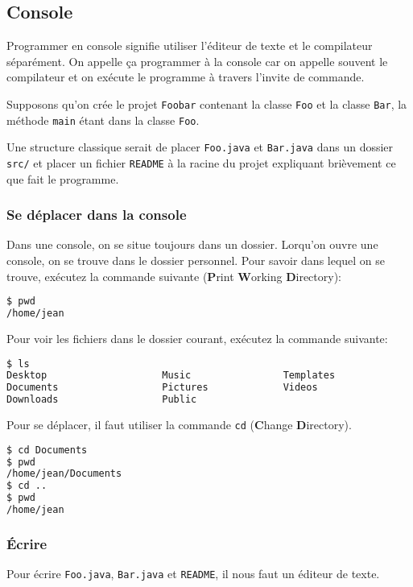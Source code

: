 \subsection{Console}
Programmer en console signifie utiliser
l'éditeur de texte et le compilateur séparément.
On appelle ça programmer à la console car on appelle souvent le compilateur
et on exécute le programme à travers l'invite de commande.

Supposons qu'on crée le projet \verb|Foobar| contenant la classe
\verb|Foo| et la classe \verb|Bar|,
la méthode \verb|main| étant dans la classe \verb|Foo|.

Une structure classique serait de placer \verb|Foo.java| et \verb|Bar.java|
dans un dossier \verb|src/| et placer un fichier \verb|README|
à la racine du projet expliquant brièvement ce que fait le programme.

\subsubsection{Se déplacer dans la console}
Dans une console, on se situe toujours dans un dossier.
Lorqu'on ouvre une console, on se trouve dans le dossier personnel.
Pour savoir dans lequel on se trouve,
exécutez la commande suivante
(\textbf{P}rint \textbf{W}orking \textbf{D}irectory):
\begin{lstlisting}[language={sh}]
$ pwd
/home/jean
\end{lstlisting}

Pour voir les fichiers dans le dossier courant, exécutez la commande suivante:
\begin{lstlisting}[language={sh}, morekeywords={ls}]
$ ls
Desktop                    Music                Templates
Documents                  Pictures             Videos
Downloads                  Public
\end{lstlisting}

Pour se déplacer, il faut utiliser la commande
\verb|cd| (\textbf{C}hange \textbf{D}irectory).
\begin{lstlisting}[language={sh}, morekeywords={xx}]
$ cd Documents
$ pwd
/home/jean/Documents
$ cd ..
$ pwd
/home/jean
\end{lstlisting}

\subsubsection{Écrire}
Pour écrire \verb|Foo.java|, \verb|Bar.java| et \verb|README|,
il nous faut un éditeur de texte.

